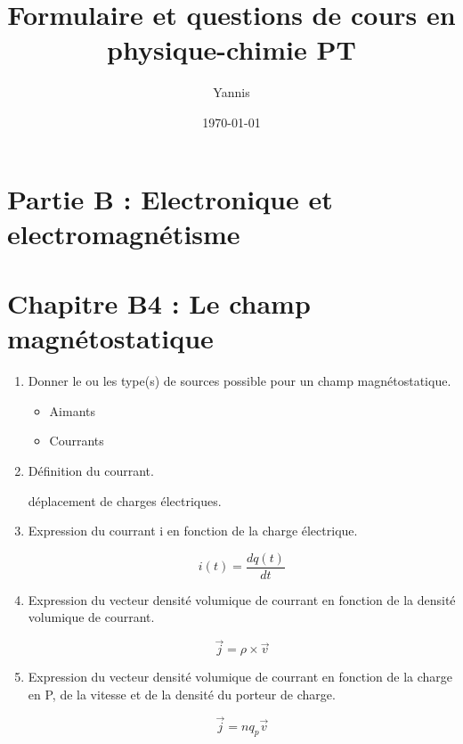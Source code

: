\documentclass{article}
\title{Formulaire et questions de cours en physique-chimie PT}
\author{Yannis}
\date{\today}
\begin{document}
\maketitle
\newpage

\section*{\centering\huge Partie B : Electronique et electromagnétisme}
\section*{\centering Chapitre B4 : Le champ magnétostatique}
\begin{enumerate}[label=\arabic{enumi} - , left=0pt, itemsep=1em] %
    \item Donner le ou les type(s) de sources possible pour un champ magnétostatique. \par
    \begin{solution}
        \begin{itemize}
            \item Aimants
            \item Courrants
        \end{itemize}
    \end{solution}

    \item Définition du courrant.\par
    \begin{solution}
        déplacement de charges électriques.
    \end{solution}

    \item Expression du courrant i en fonction de la charge électrique.\par
    \begin{solution}
        \[ i(t) = \frac{dq(t)}{dt} \]
    \end{solution}


    \item Expression du vecteur densité volumique de courrant en fonction de la densité volumique de courrant.\par
    \begin{solution}
        \[ \vec{j} = \rho \times \vec{v} \]
    \end{solution}

    \item Expression du vecteur densité volumique de courrant en fonction de la charge en P, de la vitesse et de la densité du porteur de charge.\par
    \begin{solution}
         \[ \vec{j} = n q_p \vec{v} \]
    \end{solution}


\end{enumerate}
\end{document}
